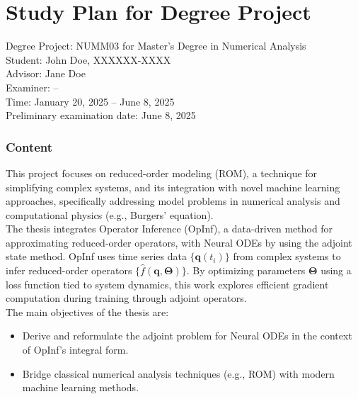 \documentclass[en,cm,10pt]{inst}
\begin{document}
	\section*{Study Plan for Degree Project}
	Degree Project: NUMM03 for Master's Degree in Numerical Analysis \\
	Student: John Doe, XXXXXX-XXXX\\
	Advisor: Jane Doe\\
	Examiner: --\\ 
	Time:  January 20, 2025 -- June 8, 2025\\
    Preliminary examination date: June 8, 2025
	
	\subsubsection*{Content}
	This project focuses on reduced-order modeling (ROM), a technique for simplifying complex systems, and its integration with novel machine learning approaches, specifically addressing model problems in numerical analysis and computational physics (e.g., Burgers' equation).\\
    
    \noindent The thesis integrates Operator Inference (OpInf), a data-driven method for approximating reduced-order operators, with Neural ODEs by using the adjoint state method. OpInf uses time series data $\{\mathbf{q}(t_i)\}$ from complex systems to infer reduced-order operators $\{\hat{f}(\mathbf{q}, \bm{\Theta})\}$. By optimizing parameters $\bm{\Theta}$ using a loss function tied to system dynamics, this work explores efficient gradient computation during training through adjoint operators.\\

    The main objectives of the thesis are:
    \begin{itemize}
        \item Derive and reformulate the adjoint problem for Neural ODEs in the context of OpInf's integral form.
        \item Bridge classical numerical analysis techniques (e.g., ROM) with modern machine learning methods.
    \end{itemize}
	
\end{document}
